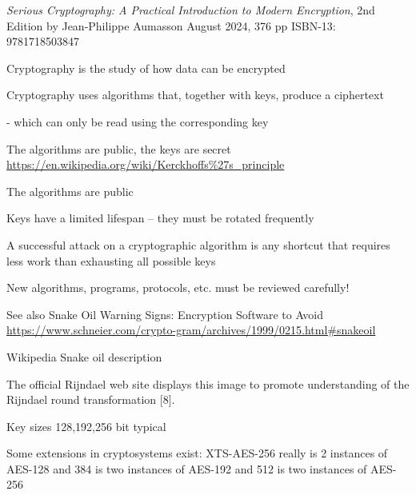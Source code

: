 \documentclass[Screen16to9,17pt]{foils}
\begin{document}


\emph{Serious Cryptography: A Practical Introduction to Modern Encryption}, 2nd Edition
by Jean-Philippe Aumasson
August 2024, 376 pp
ISBN-13:
9781718503847


\begin{list1}
\item Cryptography is the study of how data can be encrypted
\item Cryptography uses algorithms that, together with keys, produce a
  ciphertext
\item  - which can only be read using the corresponding key
\end{list1}


\begin{list2}
\item The algorithms are public, the keys are secret \url{https://en.wikipedia.org/wiki/Kerckhoffs%27s_principle}
\item The algorithms are public
\item Keys have a limited lifespan -- they must be rotated frequently
\item A successful attack on a cryptographic algorithm is any shortcut
  that requires less work than exhausting all possible keys
\item New algorithms, programs, protocols, etc. must be reviewed carefully!
\item See also Snake Oil Warning Signs:
Encryption Software to Avoid\\
\url{https://www.schneier.com/crypto-gram/archives/1999/0215.html#snakeoil}
\item Wikipedia Snake oil description 
\end{list2}




\begin{list2}
\item The official Rijndael web site displays this image to promote understanding of the Rijndael round transformation [8].
\item Key sizes 128,192,256 bit typical
\item Some extensions in cryptosystems exist: XTS-AES-256 really is 2 instances of AES-128 and 384 is two instances of AES-192 and 512 is two instances of AES-256
\item {}
\end{list2}
\end{document}
